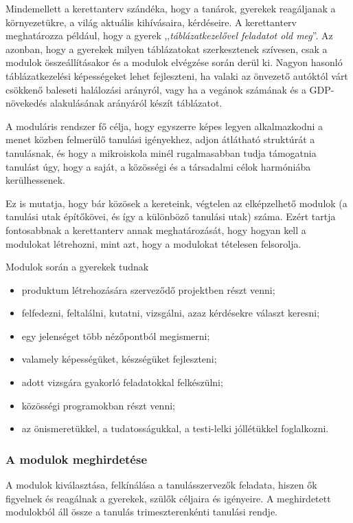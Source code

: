Mindemellett a kerettanterv szándéka, hogy a tanárok, gyerekek reagáljanak a környezetükre, a világ aktuális kihívásaira, kérdéseire. A kerettanterv meghatározza például, hogy a gyerek ,,\emph{táblázatkezelővel feladatot old meg}''. Az azonban, hogy a gyerekek milyen táblázatokat szerkesztenek szívesen, csak a modulok összeállításakor és a modulok elvégzése során derül ki. Nagyon hasonló táblázatkezelési képességeket lehet fejleszteni, ha valaki az önvezető autóktól várt csökkenő baleseti halálozási arányról, vagy ha a vegánok számának és a GDP-növekedés alakulásának arányáról készít táblázatot.

A moduláris rendszer fő célja, hogy egyszerre képes legyen alkalmazkodni a menet közben felmerülő tanulási igényekhez, adjon átlátható struktúrát a tanulásnak, és hogy a mikroiskola minél rugalmasabban tudja támogatni\break a tanulást úgy, hogy a saját, a közösségi és a társadalmi célok harmóniába kerülhessenek.

Ez is mutatja, hogy bár közösek a kereteink, végtelen az elképzelhető modulok (a tanulási utak építőkövei, és így a különböző tanulási utak) száma. Ezért tartja fontosabbnak a kerettanterv annak meghatározását, hogy hogyan kell a modulokat létrehozni, mint azt, hogy a modulokat tételesen felsorolja.

Modulok során a gyerekek tudnak

\begin{itemize}
      \item produktum létrehozására szerveződő projektben részt venni;

      \item felfedezni, feltalálni, kutatni, vizsgálni, azaz kérdésekre választ keresni;

      \item egy jelenséget több nézőpontból megismerni;

      \item valamely képességüket, készségüket fejleszteni;

      \item adott vizsgára gyakorló feladatokkal felkészülni;

      \item közösségi programokban részt venni;

      \item az önismeretükkel, a tudatosságukkal, a testi-lelki jóllétükkel fog\-lal\-kozni.
\end{itemize}

\subsubsection{A modulok meghirdetése}
\label{sec:modulok_meghirdetese}
A modulok kiválasztása, felkínálása a tanulásszervezők feladata, hiszen ők figyelnek és reagálnak a gyerekek, szülők céljaira és igényeire. A meghirdetett modulokból áll össze a tanulás trimeszterenkénti tanulási rendje.

